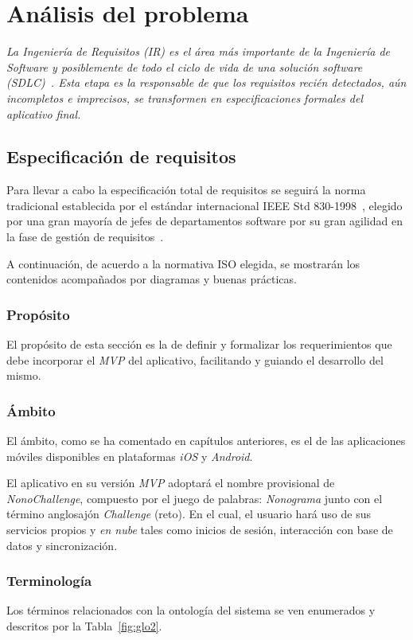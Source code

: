\chapter{Análisis del problema}
\textit{La Ingeniería de Requisitos (IR) es el área más importante de la Ingeniería de Software y posiblemente de todo el 
ciclo de vida de una solución software (SDLC)~\cite{chakraboty2012requirements}. Esta etapa es la responsable de que los 
requisitos recién detectados, aún incompletos e imprecisos, se transformen en especificaciones formales del aplicativo final.}

\section{Especificación de requisitos}
Para llevar a cabo la especificación total de requisitos se seguirá la norma tradicional establecida por el estándar internacional 
IEEE Std 830-1998~\cite{8559686}, elegido por una gran mayoría de jefes de departamentos software por su gran agilidad en la fase de gestión 
de requisitos~\cite{guzman2018impacto}.

A continuación, de acuerdo a la normativa ISO elegida, se mostrarán los contenidos acompañados por diagramas y buenas prácticas.

\subsection{Propósito}
El propósito de esta sección es la de definir y formalizar los requerimientos que debe incorporar el \textit{MVP} del aplicativo, facilitando
y guiando el desarrollo del mismo.

\subsection{Ámbito}
El ámbito, como se ha comentado en capítulos anteriores, es el de las aplicaciones móviles disponibles en plataformas \textit{iOS} y 
\textit{Android}.

El aplicativo en su versión \textit{MVP} adoptará el nombre provisional de \textit{NonoChallenge}, compuesto por el juego de palabras:
 \textit{Nonograma} junto con el término anglosajón \textit{Challenge} (reto).
En el cual, el usuario hará uso de sus servicios propios y \textit{en nube} tales como inicios de sesión, interacción con base de datos y
sincronización.

\subsection{Terminología}
Los términos relacionados con la ontología del sistema se ven enumerados y descritos por la Tabla~\ref{fig:glo2}.

